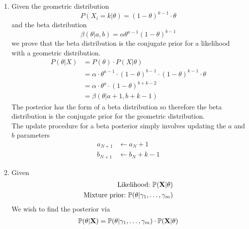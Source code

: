 \documentclass{article}
\begin{document}
\begin{enumerate}
\begin{enumerate}
            \item %
                Given the geometric distribution
                \begin{equation*}
                    P(X_i=k|\theta)= (1-\theta)^{k-1} \cdot \theta
                \end{equation*}
                and the beta distribution
                \begin{equation*}
                    \beta(\theta|a,b)= \alpha \theta^{a-1} (1-\theta)^{b-1}
                \end{equation*}
                we prove that the beta distribution is the conjugate prior
                for a likelihood with a geometric distribution.
                \begin{align*}
                    P(\theta|X)
                    &= P(\theta) \cdot P(X|\theta) \\
                    &= \alpha \cdot \theta^{a-1} \cdot (1-\theta)^{b-1} 
                        \cdot (1-\theta)^{k-1} \cdot \theta \\
                    &= \alpha \cdot \theta^{a} \cdot (1-\theta)^{b+k-2} \\
                    &= \beta(\theta|a+1, b+k-1) 
                \end{align*}
                The posterior has the form of a beta distribution so
                therefore the beta distribution is the conjugate prior for
                the geometric distribution. \\
                The update procedure for a beta posterior simply involves
                updating the \(a\) and \(b\) parameters
                \begin{align*}
                    a_{N+1} &\leftarrow a_N + 1 \\
                    b_{N+1} &\leftarrow b_N + k - 1
                \end{align*}
            \item %
              Given
              \begin{align*}
                \textnormal{Likelihood:\ } \mathbb{P}(\mathbf{X}|\theta) \\
                \textnormal{Mixture prior:\ } \mathbb{P}(\theta|\gamma_1,\hdots,\gamma_m)
              \end{align*}
              We wish to find the posterior via
              \begin{align*}
                \pr(\theta|\mathbf{X}) &= \pr(\theta|\gamma_1,\hdots,\gamma_m)
                \cdot \pr(\mathbf{X}|\theta) \\

\end{align*}
\end{enumerate}
\end{enumerate}
\end{document}
